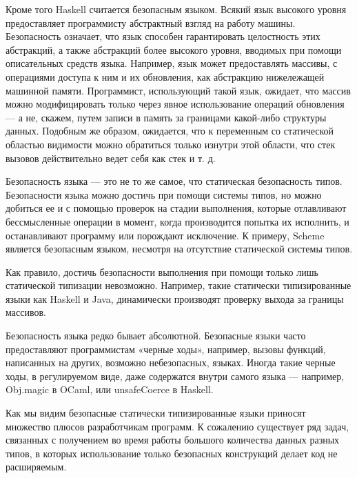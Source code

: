 \documentclass[a4paper,12pt]{article}
\begin{document}
Кроме того Haskell считается безопасным языком. Всякий язык высокого
уровня предоставляет программисту абстрактный взгляд на работу
машины. Безопасность означает, что язык способен гарантировать
целостность этих абстракций, а также абстракций более высокого уровня,
вводимых при помощи описательных средств языка. Например, язык может
предоставлять массивы, с операциями доступа к ним и их обновления, как
абстракцию нижележащей машинной памяти. Программист, использующий
такой язык, ожидает, что массив можно модифицировать только через
явное использование операций обновления — а не, скажем, путем записи в
память за границами какой-либо структуры данных.  Подобным же образом,
ожидается, что к переменным со статической областью видимости можно
обратиться только изнутри этой области, что стек вызовов действительно
ведет себя как стек и т. д.

Безопасность языка — это не то же самое, что статическая безопасность
типов. Безопасности языка можно достичь при помощи системы типов, но
можно добиться ее и с помощью проверок на стадии выполнения, которые
отлавливают бессмысленные операции в момент, когда производится
попытка их исполнить, и останавливают программу или порождают
исключение. К примеру, Scheme является безопасным языком, несмотря на
отсутствие статической системы типов.

Как правило, достичь безопасности выполнения при помощи только лишь
статической типизации невозможно. Например, такие статически
типизированные языки как Haskell и Java, динамически производят
проверку выхода за границы массивов.

Безопасность языка редко бывает абсолютной. Безопасные языки часто
предоставляют программистам «черные ходы», например, вызовы функций,
написанных на других, возможно небезопасных, языках. Иногда такие
черные ходы, в регулируемом виде, даже содержатся внутри самого языка
— например, Obj.magic в OCaml, или unsafeCoerce в Haskell.

Как мы видим безопасные статически типизированные языки приносят
множество плюсов разработчикам программ. К сожалению существует ряд
задач, связанных с получением во время работы большого количества
данных разных типов, в которых использование только безопасных
конструкций делает код не расширяемым.
\end{document}
